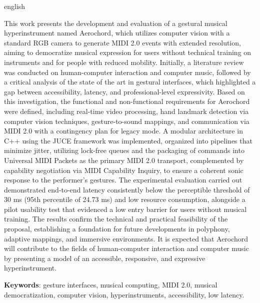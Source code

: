 \setlength{\absparsep}{18pt}
\begin{resumo}[ABSTRACT]
 \begin{otherlanguage*}{english}

This work presents the development and evaluation of a gestural musical hyperinstrument named Aerochord, which utilizes computer vision with a standard RGB camera to generate MIDI 2.0 events with extended resolution, aiming to democratize musical expression for users without technical training on instruments and for people with reduced mobility. Initially, a literature review was conducted on human-computer interaction and computer music, followed by a critical analysis of the state of the art in gestural interfaces, which highlighted a gap between accessibility, latency, and professional-level expressivity. Based on this investigation, the functional and non-functional requirements for Aerochord were defined, including real-time video processing, hand landmark detection via computer vision techniques, gesture-to-sound mappings, and communication via MIDI 2.0 with a contingency plan for legacy mode. A modular architecture in C++ using the JUCE framework was implemented, organized into pipelines that minimize jitter, utilizing lock-free queues and the packaging of commands into Universal MIDI Packets as the primary MIDI 2.0 transport, complemented by capability negotiation via MIDI Capability Inquiry, to ensure a coherent sonic response to the performer's gestures. The experimental evaluation carried out demonstrated end-to-end latency consistently below the perceptible threshold of 30 ms (95th percentile of 24.73 ms) and low resource consumption, alongside a pilot usability test that evidenced a low entry barrier for users without musical training. The results confirm the technical and practical feasibility of the proposal, establishing a foundation for future developments in polyphony, adaptive mappings, and immersive environments. It is expected that Aerochord will contribute to the fields of human-computer interaction and computer music by presenting a model of an accessible, responsive, and expressive hyperinstrument.


\textbf{Keywords}: gesture interfaces, musical computing, MIDI 2.0, musical democratization, computer vision, hyperinstruments, accessibility, low latency.
 \end{otherlanguage*}
\end{resumo}